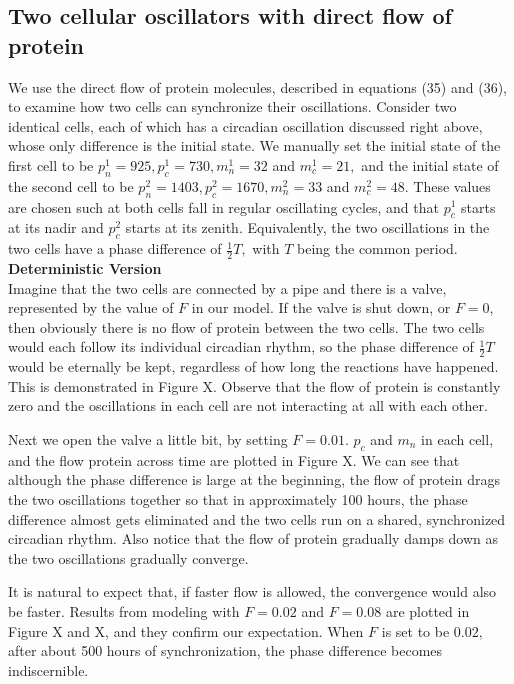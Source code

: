 \documentclass[12pt]{article}
\renewcommand{\(}{\left (}
\renewcommand{\)}{\right )}
\begin{document}
\subsection{Two cellular oscillators with direct flow of protein}
\hspace{5mm} We use the direct flow of protein molecules, described in equations (35) and (36), to examine how two cells can synchronize their oscillations. Consider two identical cells, each of which has a circadian oscillation discussed right above, whose only difference is the initial state. We manually set the initial state of the first cell to be $p^1_n = 925, p^1_c = 730, m^1_n = 32$ and $m^1_c = 21,$ and the initial state of the second cell to be $p^2_n = 1403, p^2_c = 1670, m^2_n = 33$ and $m^2_c = 48.$ These values are chosen such at both cells fall in regular oscillating cycles, and that $p^1_c$ starts at its nadir and $p^2_c$ starts at its zenith. Equivalently, the two oscillations in the two cells have a phase difference of $\frac{1}{2}T,$ with $T$ being the common period.\\

\textbf{Deterministic Version}\\
\hspace{5mm} Imagine that the two cells are connected by a pipe and there is a valve, represented by the value of $F$ in our model. If the valve is shut down, or $F=0,$ then obviously there is no flow of protein between the two cells. The two cells would each follow its individual circadian rhythm, so the phase difference of $\frac{1}{2}T$ would be eternally be kept, regardless of how long the reactions have happened. This is demonstrated in Figure X. Observe that the flow of protein is constantly zero and the oscillations in each cell are not interacting at all with each other.


Next we open the valve a little bit, by setting $F = 0.01.$ $p_c$ and $m_n$ in each cell, and the flow protein across time are plotted in Figure X. We can see that although the phase difference is large at the beginning, the flow of protein drags the two oscillations together so that in approximately 100 hours, the phase difference almost gets eliminated and the two cells run on a shared, synchronized circadian rhythm. Also notice that the flow of protein gradually damps down as the two oscillations gradually converge.


It is natural to expect that, if faster flow is allowed, the convergence would also be faster. Results from modeling with $F = 0.02$ and $F=0.08$ are plotted in Figure X and X, and they confirm our expectation. When $F$ is set to be $0.02,$ after about 500 hours of synchronization, the phase difference becomes indiscernible.
\end{document}
